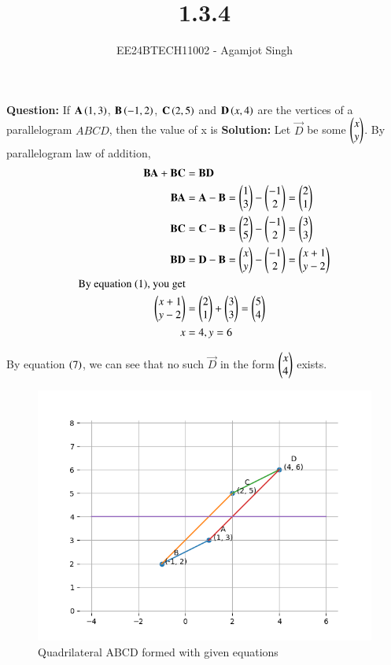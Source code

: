 \documentclass[journal]{IEEEtran}
\begin{document}

\vspace{3cm}

\title{1.3.4}
\author{EE24BTECH11002 - Agamjot Singh
}
{\let\newpage\relax\maketitle}

\renewcommand{\thefigure}{\theenumi}
\renewcommand{\thetable}{\theenumi}
\setlength{\intextsep}{10pt} %

\textbf{Question:}
\newline
If $\mathbf{A}\left(1,3\right)$, $\mathbf{B}\left(-1,2\right)$, $\mathbf{C}\left(2,5\right)$ and $\mathbf{D}\left(x,4\right)$ are the vertices of a parallelogram $ABCD$, then the value of x is
\newline
\textbf{Solution:}
Let $\vec{D}$ be some $\begin{pmatrix}x\\y\end{pmatrix}$.
By parallelogram law of addition, 
\begin{align}
	\mathbf{BA} + \mathbf{BC} &= \mathbf{BD}\\
	\mathbf{BA} &= \mathbf{A} - \mathbf{B} = \begin{pmatrix}1\\3\end{pmatrix} - \begin{pmatrix}-1\\2\end{pmatrix} = \begin{pmatrix}2\\1\end{pmatrix}\\
	\mathbf{BC} &= \mathbf{C} - \mathbf{B} = \begin{pmatrix}2\\5\end{pmatrix} - \begin{pmatrix}-1\\2\end{pmatrix} = \begin{pmatrix}3\\3\end{pmatrix}\\
	\mathbf{BD} &= \mathbf{D} - \mathbf{B} = \begin{pmatrix}x\\y\end{pmatrix} - \begin{pmatrix}-1\\2\end{pmatrix} = \begin{pmatrix}x+1\\y-2\end{pmatrix}\\
	\text{By equation (1), you get}\\
	\begin{pmatrix}x+1\\y-2\end{pmatrix} &= \begin{pmatrix}2\\1\end{pmatrix} + \begin{pmatrix}3\\3\end{pmatrix} = \begin{pmatrix}5\\4\end{pmatrix}\\
	x &= 4, y = 6
\end{align}

By equation $\left(7\right)$, we can see that no such $\vec{D}$ in the form $\begin{pmatrix}x\\4\end{pmatrix}$ exists.


\begin{figure}[h!]
   \centering
   \includegraphics[width=0.7\linewidth]{figs/graph.png}
   \caption{Quadrilateral ABCD formed with given equations}
   \label{label}
\end{figure}
\end{document}
